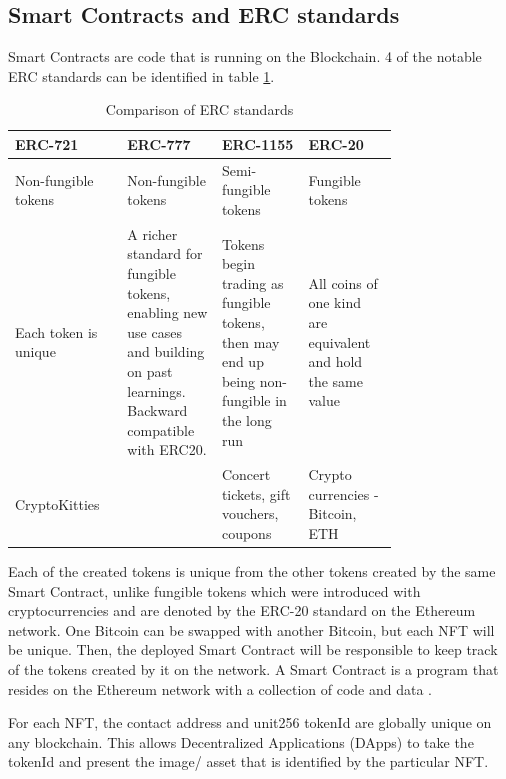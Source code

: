 \documentclass[conference]{IEEEtran}
\begin{document}
\subsection{Smart Contracts and ERC standards}

Smart Contracts are code that is running on the Blockchain. 4 of the notable ERC standards can be identified in table \ref{tab:erc-comparison}.


\begin{table}[htbp]
\caption{Comparison of ERC standards}
\begin{center}
\begin{tabular}{|p{0.19\linewidth}|p{0.19\linewidth}|p{0.19\linewidth}|p{0.19\linewidth}|}
\hline
\textbf{ERC-721} & \textbf{ERC-777} & \textbf{ERC-1155} & \textbf{ERC-20} \\ 
\hline
Non-fungible tokens & Non-fungible tokens \autocite{dafflon_eip-777_2017} & Semi-fungible tokens \autocite{prathap_semi-fungible_2021} & Fungible tokens \\ 
\hline
Each token is unique & A richer standard for fungible tokens, enabling new use cases and building on past learnings. Backward compatible with ERC20. & Tokens begin trading as fungible tokens, then may end up being non-fungible in the long run & All coins of one kind are equivalent and hold the same value \\ 
\hline
CryptoKitties \autocite{cryptokitties_cryptokitties_nodate} &  & Concert tickets, gift vouchers, coupons & Crypto currencies - Bitcoin, ETH \\
\hline
\end{tabular}
\label{tab:erc-comparison}
\end{center}
\end{table}

\bigbreak
Each of the created tokens is unique from the other tokens created by the same Smart Contract, unlike fungible tokens which were introduced with cryptocurrencies and are denoted by the ERC-20 standard \autocite{noauthor_erc-20_nodate} on the Ethereum network. One Bitcoin can be swapped with another Bitcoin, but each NFT will be unique.
Then, the deployed Smart Contract will be responsible to keep track of the tokens created by it on the network. A Smart Contract is a program that resides on the Ethereum network with a collection of code and data \autocite{noauthor_introduction_nodate}.

For each NFT, the contact address and unit256 tokenId are globally unique on any blockchain. This allows Decentralized Applications (DApps) \autocite{frankenfield_decentralized_nodate, noauthor_decentralized_2021} to take the tokenId and present the image/ asset that is identified by the particular NFT.
\end{document}
